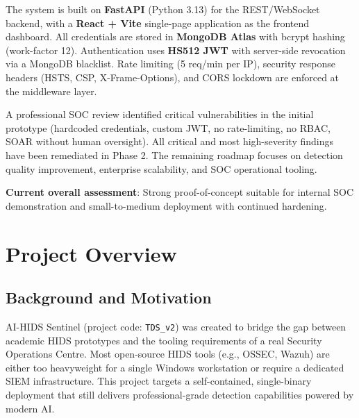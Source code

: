 \documentclass[12pt,a4paper]{article}
\begin{document}
\begin{onehalfspace}
\medskip

The system is built on \textbf{FastAPI} (Python 3.13) for the REST/WebSocket backend,
with a \textbf{React + Vite} single-page application as the frontend dashboard.
All credentials are stored in \textbf{MongoDB Atlas} with bcrypt hashing (work-factor 12).
Authentication uses \textbf{HS512 JWT} with server-side revocation via a MongoDB blacklist.
Rate limiting (5 req/min per IP), security response headers (HSTS, CSP, X-Frame-Options),
and CORS lockdown are enforced at the middleware layer.

\medskip

A professional SOC review identified critical vulnerabilities in the initial prototype
(hardcoded credentials, custom JWT, no rate-limiting, no RBAC, SOAR without human oversight).
All critical and most high-severity findings have been remediated in Phase 2.
The remaining roadmap focuses on detection quality improvement, enterprise scalability,
and SOC operational tooling.

\medskip

\textbf{Current overall assessment}: Strong proof-of-concept suitable for internal
SOC demonstration and small-to-medium deployment with continued hardening.
\end{onehalfspace}

\newpage

\tableofcontents
\newpage

\section{Project Overview}

\subsection{Background and Motivation}

AI-HIDS Sentinel (project code: \texttt{TDS\_v2}) was created to bridge the gap between
academic HIDS prototypes and the tooling requirements of a real Security Operations Centre.
Most open-source HIDS tools (e.g., OSSEC, Wazuh) are either too heavyweight for a single
Windows workstation or require a dedicated SIEM infrastructure. This project targets a
self-contained, single-binary deployment that still delivers professional-grade detection
capabilities powered by modern AI.
\end{document}
